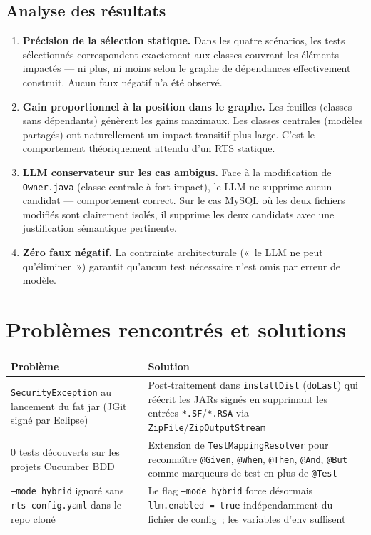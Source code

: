 \documentclass[12pt,a4paper]{article}
\begin{document}
\subsection{Analyse des résultats}

\begin{enumerate}[leftmargin=*, label=\textbf{\arabic{enumi}.}]
  \item \textbf{Précision de la sélection statique.} Dans les quatre scénarios,
        les tests sélectionnés correspondent exactement aux classes couvrant les
        éléments impactés — ni plus, ni moins selon le graphe de dépendances
        effectivement construit. Aucun faux négatif n'a été observé.

  \item \textbf{Gain proportionnel à la position dans le graphe.} Les feuilles
        (classes sans dépendants) génèrent les gains maximaux. Les classes
        centrales (modèles partagés) ont naturellement un impact transitif plus
        large. C'est le comportement théoriquement attendu d'un RTS statique.

  \item \textbf{LLM conservateur sur les cas ambigus.} Face à la modification
        de \texttt{Owner.java} (classe centrale à fort impact), le LLM ne
        supprime aucun candidat — comportement correct. Sur le cas MySQL où les
        deux fichiers modifiés sont clairement isolés, il supprime les deux
        candidats avec une justification sémantique pertinente.

  \item \textbf{Zéro faux négatif.} La contrainte architecturale («~le LLM ne
        peut qu'éliminer~») garantit qu'aucun test nécessaire n'est omis par
        erreur de modèle.
\end{enumerate}

\section{Problèmes rencontrés et solutions}

\begin{tabularx}{\linewidth}{L{4.5cm} X}
\toprule
\textbf{Problème} & \textbf{Solution} \\
\midrule
\texttt{SecurityException} au lancement du fat jar (JGit signé par Eclipse) &
  Post-traitement dans \texttt{installDist} (\texttt{doLast}) qui réécrit
  les JARs signés en supprimant les entrées \texttt{*.SF}/\texttt{*.RSA} via
  \texttt{ZipFile}/\texttt{ZipOutputStream} \\[4pt]
0 tests découverts sur les projets Cucumber BDD &
  Extension de \texttt{TestMappingResolver} pour reconnaître \texttt{@Given},
  \texttt{@When}, \texttt{@Then}, \texttt{@And}, \texttt{@But} comme marqueurs
  de test en plus de \texttt{@Test} \\[4pt]
\texttt{--mode hybrid} ignoré sans \texttt{rts-config.yaml} dans le repo cloné &
  Le flag \texttt{--mode hybrid} force désormais \texttt{llm.enabled = true}
  indépendamment du fichier de config~; les variables d'env suffisent \\
\bottomrule
\end{tabularx}
\end{document}
